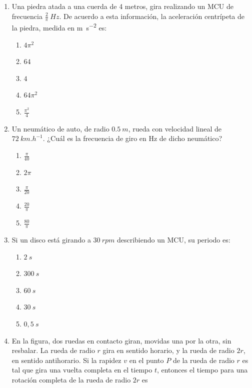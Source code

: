 \documentclass[letterpaper]{article}
\begin{document}
\begin{enumerate}
\item Una piedra atada a una cuerda de 4 metros, gira realizando un MCU de frecuencia $\frac2\pi\ \si{Hz}$. De acuerdo a esta información, la aceleración centrípeta de la piedra, medida en \si{m.s^{-2}} es:
\begin{enumerate}[label=\Alph*)]
\item $4\pi^2$
\item $64$
\item $4$
\item $64\pi^2$
\item $\frac{\pi^2}{4}$
\end{enumerate}

\item Un neumático de auto, de radio $0.5\ \si{m}$, rueda con velocidad lineal de $72\ \si{km.h^{-1}}$. ¿Cuál es la frecuencia de giro en \si{Hz} de dicho neumático?
\begin{enumerate}[label=\Alph*)]
\item $\frac{\pi}{40}$
\item $2\pi$
\item $\frac{\pi}{20}$
\item $\frac{20}{\pi}$
\item $\frac{80}{\pi}$
\end{enumerate}

\item Si un disco está girando a $30\ \si{rpm}$ describiendo un MCU, su periodo es:
\begin{enumerate}[label=\Alph*)]
\item $2\ \si{s}$
\item $300\ \si{s}$
\item $60\ \si{s}$
\item $30\ \si{s}$
\item $0,5\ \si{s}$
\end{enumerate}

\pagebreak

\item En la figura, dos ruedas en contacto giran, movidas una por la otra, sin resbalar. La rueda de radio $r$ gira en sentido horario, y la rueda de radio $2r$, en sentido antihorario. Si la
rapidez $v$ en el punto $P$ de la rueda de radio $r$ es tal que gira una vuelta completa en el
tiempo $t$, entonces el tiempo para una rotación completa de la rueda de radio $2r$ es

\begin{figure}[h]
\centering



\end{figure}
\end{enumerate}
\end{document}

